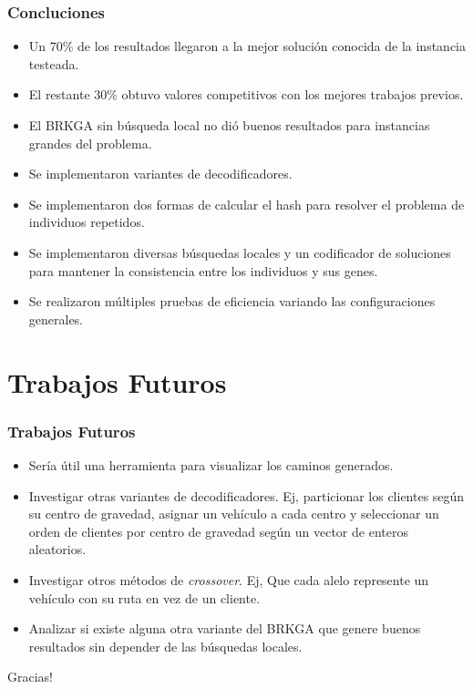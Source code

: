 \documentclass{beamer}
\begin{document}
\begin{frame}
\frametitle{Concluciones}

\begin{itemize}
    \item Un 70\% de los resultados llegaron a la mejor solución conocida de la instancia testeada.
    \pause
    \item El restante 30\% obtuvo valores competitivos con los mejores trabajos previos.
    \pause
    \item El BRKGA sin búsqueda local no dió buenos resultados para instancias grandes del problema.
    \pause
    \item Se implementaron variantes de decodificadores.
    \pause
    \item Se implementaron dos formas de calcular el hash para resolver el problema de individuos repetidos.
    \pause
    \item Se implementaron diversas búsquedas locales y un codificador de soluciones para mantener la consistencia entre los individuos y sus genes.
    \pause
    \item Se realizaron múltiples pruebas de eficiencia variando las configuraciones generales.
\end{itemize}

\end{frame}


\section{Trabajos Futuros}

\begin{frame}
\frametitle{Trabajos Futuros}

\begin{itemize}
    \item Sería útil una herramienta para visualizar los caminos generados.
    \pause
    \item Investigar otras variantes de decodificadores. Ej, particionar los clientes según su centro de gravedad, asignar un vehículo a cada centro y seleccionar un orden de clientes por centro de gravedad según un vector de enteros aleatorios.
    \pause
    \item Investigar otros métodos de \textit{crossover}. Ej, Que cada alelo represente un vehículo con su ruta en vez de un cliente.
    \pause
    \item Analizar si existe alguna otra variante del BRKGA que genere buenos resultados sin depender de las búsquedas locales.
\end{itemize}

\end{frame}



\begin{frame}
\Huge{\centerline{Gracias!}}
\end{frame}

\end{document}
